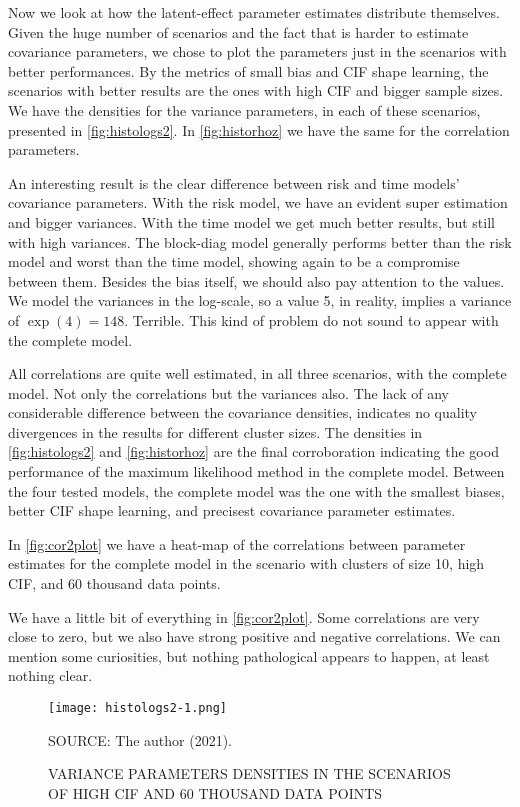 Now we look at how the latent-effect parameter estimates distribute
themselves. Given the huge number of scenarios and the fact that is
harder to estimate covariance parameters, we chose to plot the
parameters just in the scenarios with better performances. By the
metrics of small bias and CIF shape learning, the scenarios with better
results are the ones with high CIF and bigger sample sizes. We have the
densities for the variance parameters, in each of these scenarios,
presented in \autoref{fig:histologs2}. In \autoref{fig:historhoz} we
have the same for the correlation parameters.

An interesting result is the clear difference between risk and time
models' covariance parameters. With the risk model, we have an evident
super estimation and bigger variances. With the time model we get much
better results, but still with high variances. The block-diag model
generally performs better than the risk model and worst than the time
model, showing again to be a compromise between them. Besides the bias
itself, we should also pay attention to the values. We model the
variances in the log-scale, so a value 5, in reality, implies a variance
of \(\exp(4) = 148\). Terrible. This kind of problem do not sound to
appear with the complete model.

All correlations are quite well estimated, in all three scenarios, with
the complete model. Not only the correlations but the variances
also. The lack of any considerable difference between the covariance
densities, indicates no quality divergences in the results for different
cluster sizes. The densities in \autoref{fig:histologs2} and
\autoref{fig:historhoz} are the final corroboration indicating the good
performance of the maximum likelihood method in the complete
model. Between the four tested models, the complete model was the one
with the smallest biases, better CIF shape learning, and precisest
covariance parameter estimates.

In \autoref{fig:cor2plot} we have a heat-map of the correlations between
parameter estimates for the complete model in the scenario with clusters
of size 10, high CIF, and 60 thousand data points.

We have a little bit of everything in \autoref{fig:cor2plot}. Some
correlations are very close to zero, but we also have strong positive
and negative correlations. We can mention some curiosities, but nothing
pathological appears to happen, at least nothing clear.

\begin{figure}[!htpb]
 \setlength{\abovecaptionskip}{.0001pt}
 \caption{VARIANCE PARAMETERS DENSITIES IN THE SCENARIOS OF HIGH CIF AND
          60 THOUSAND DATA POINTS}
 \vspace{0.2cm}\centering
 \texttt{[image: histologs2-1.png]}\\
 \begin{footnotesize}
  SOURCE: The author (2021).
 \end{footnotesize}
 \label{fig:histologs2}
\end{figure}

